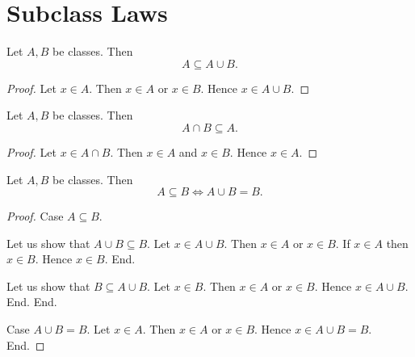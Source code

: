 \documentclass[10pt]{article}
\begin{document}
  \section{Subclass Laws}

  \begin{forthel}
    \begin{proposition}
      Let $A, B$ be classes.
      Then \[ A \subseteq A \cup B. \]
    \end{proposition}
    \begin{proof}
      Let $x \in A$.
      Then $x \in A$ or $x \in B$.
      Hence $x \in A \cup B$.
    \end{proof}
  \end{forthel}

  \begin{forthel}
    \begin{proposition}
      Let $A, B$ be classes.
      Then \[ A \cap B \subseteq A. \]
    \end{proposition}
    \begin{proof}
      Let $x \in A \cap B$.
      Then $x \in A$ and $x \in B$.
      Hence $x \in A$.
    \end{proof}
  \end{forthel}

  \begin{forthel}
    \begin{proposition}
      Let $A, B$ be classes.
      Then \[ A \subseteq B \iff A \cup B = B. \]
    \end{proposition}
    \begin{proof}
      Case $A \subseteq B$.

        Let us show that $A \cup B \subseteq B$.
          Let $x \in A \cup B$.
          Then $x \in A$ or $x \in B$.
          If $x \in A$ then $x \in B$.
          Hence $x \in B$.
        End.

        Let us show that $B \subseteq A \cup B$.
          Let $x \in B$.
          Then $x \in A$ or $x \in B$.
          Hence $x \in A \cup B$.
        End.
      End.

      Case $A \cup B = B$.
        Let $x \in A$.
        Then $x \in A$ or $x \in B$.
        Hence $x \in A \cup B = B$.
      End.
    \end{proof}
  \end{forthel}
\end{document}
